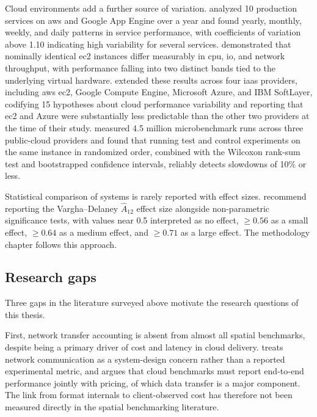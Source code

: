 Cloud environments add a further source of variation. \textcite{iosup2011_performance_variability_cloud_services} analyzed \num{10} production services on \acrlong{aws} and Google App Engine over a year and found yearly, monthly, weekly, and daily patterns in service performance, with coefficients of variation above \num{1.10} indicating high variability for several services. \textcite{schad2010_runtime_measurements_cloud} demonstrated that nominally identical \acrfull{ec2} instances differ measurably in \acrshort{cpu}, \acrshort{io}, and network throughput, with performance falling into two distinct bands tied to the underlying virtual hardware. \textcite{leitner2016_patterns_chaos_iaas} extended these results across four \acrshort{iaas} providers, including \acrshort{aws} \acrshort{ec2}, Google Compute Engine, Microsoft Azure, and IBM SoftLayer, codifying \num{15} hypotheses about cloud performance variability and reporting that \acrshort{ec2} and Azure were substantially less predictable than the other two providers at the time of their study. \textcite{laaber2019_software_microbenchmarking_cloud} measured \num{4.5} million microbenchmark runs across three public-cloud providers and found that running test and control experiments on the same instance in randomized order, combined with the Wilcoxon rank-sum test and bootstrapped confidence intervals, reliably detects slowdowns of \num{10}\% or less.

Statistical comparison of systems is rarely reported with effect sizes. \textcite{arcuri2014_hitchhiker_statistical_tests} recommend reporting the Vargha--Delaney $\hat{A}_{12}$ effect size alongside non-parametric significance tests, with values near \num{0.5} interpreted as no effect, $\geq \num{0.56}$ as a small effect, $\geq \num{0.64}$ as a medium effect, and $\geq \num{0.71}$ as a large effect. The methodology chapter follows this approach.

\subsection{Research gaps}
Three gaps in the literature surveyed above motivate the research questions of this thesis.

First, network transfer accounting is absent from almost all spatial benchmarks, despite being a primary driver of cost and latency in cloud delivery. \textcite{tang2020_locationspark_distributed_spatial_query} treats network communication as a system-design concern rather than a reported experimental metric, and \textcite{folkerts2012_benchmarking_in_the_cloud} argues that cloud benchmarks must report end-to-end performance jointly with pricing, of which data transfer is a major component. The link from format internals to client-observed cost has therefore not been measured directly in the spatial benchmarking literature.


